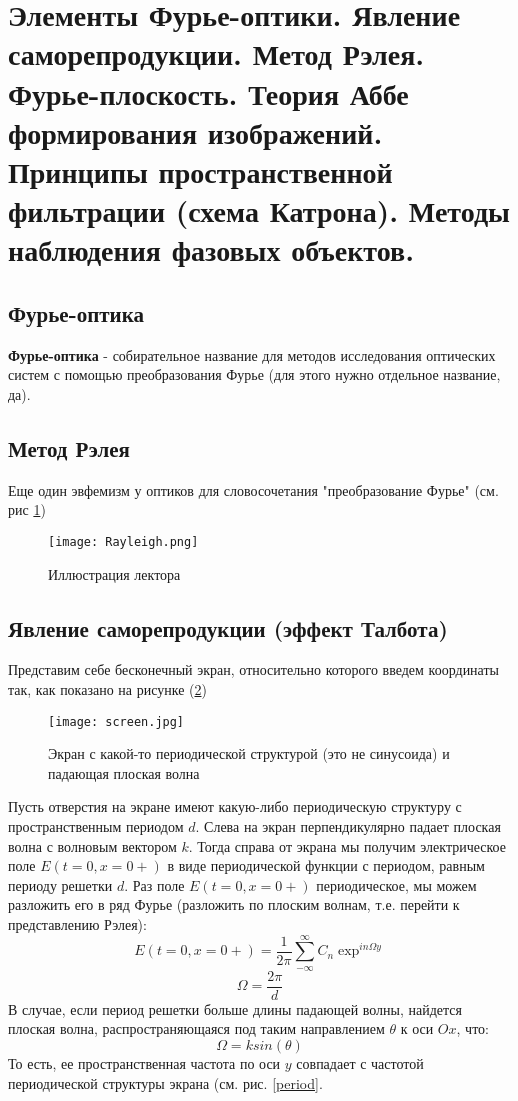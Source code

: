 \section{Элементы Фурье-оптики. Явление саморепродукции. Метод Рэлея. Фурье-плоскость. Теория Аббе формирования изображений. Принципы пространственной фильтрации (схема Катрона). Методы наблюдения фазовых объектов.}

\subsection{Фурье-оптика}
\textbf{Фурье-оптика} - собирательное название для методов исследования оптических систем с помощью преобразования Фурье (для этого нужно отдельное название, да).


\subsection{Метод Рэлея}
Еще один эвфемизм у оптиков для словосочетания "преобразование Фурье" (см. рис \ref{fig:my_label})
\begin{figure}[H]
    \centering
    \texttt{[image: Rayleigh.png]}
    \caption{Иллюстрация лектора}
    \label{fig:my_label}
\end{figure}

\subsection{Явление саморепродукции (эффект Талбота)} Представим себе бесконечный экран, относительно которого введем координаты так, как показано на рисунке (\ref{screen})
\begin{figure}[h]
    \centering
    \texttt{[image: screen.jpg]}
    \caption{Экран с какой-то периодической структурой (это не синусоида) и падающая плоская волна}
    \label{screen}
\end{figure}
Пусть отверстия на экране имеют какую-либо периодическую структуру с пространственным периодом \(d\). Слева на экран перпендикулярно падает плоская волна с волновым вектором \(k\). Тогда справа от экрана мы получим электрическое поле \(E(t = 0, x = 0+)\) в виде периодической функции с периодом, равным периоду решетки \(d\).  Раз поле \(E(t = 0, x = 0+)\) периодическое, мы можем разложить его в ряд Фурье (разложить по плоским волнам, т.е. перейти к представлению Рэлея):
\begin{equation}
    E(t = 0, x = 0+) = \frac{1}{2\pi} \sum_{-\infty}^{\infty} C_n \exp^{in\Omega y}
\end{equation}
\begin{equation}
\Omega = \frac{2\pi}{d}
\end{equation}
В случае, если период решетки больше длины падающей волны, найдется плоская волна, распространяющаяся под таким направлением \(\theta\) к оси \(Ox\), что:
\begin{equation}
\Omega = k sin(\theta)
\end{equation}
То есть, ее пространственная частота по оси \(y\) совпадает с частотой периодической структуры экрана (см. рис. \ref{period}.


